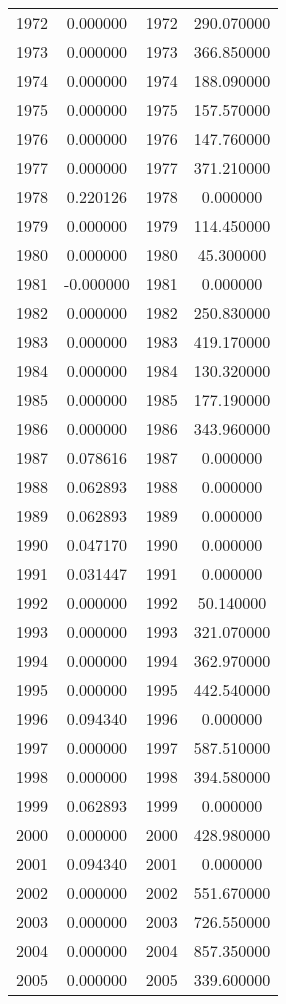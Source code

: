 \documentclass[12pt]{article}
\begin{document}
\begin{longtable}{@{}cccc@{}}
1972 & 0.000000 & 1972 & 290.070000 \\
1973 & 0.000000 & 1973 & 366.850000 \\
1974 & 0.000000 & 1974 & 188.090000 \\
1975 & 0.000000 & 1975 & 157.570000 \\
1976 & 0.000000 & 1976 & 147.760000 \\
1977 & 0.000000 & 1977 & 371.210000 \\
1978 & 0.220126 & 1978 & 0.000000 \\
1979 & 0.000000 & 1979 & 114.450000 \\
1980 & 0.000000 & 1980 & 45.300000 \\
1981 & -0.000000 & 1981 & 0.000000 \\
1982 & 0.000000 & 1982 & 250.830000 \\
1983 & 0.000000 & 1983 & 419.170000 \\
1984 & 0.000000 & 1984 & 130.320000 \\
1985 & 0.000000 & 1985 & 177.190000 \\
1986 & 0.000000 & 1986 & 343.960000 \\
1987 & 0.078616 & 1987 & 0.000000 \\
1988 & 0.062893 & 1988 & 0.000000 \\
1989 & 0.062893 & 1989 & 0.000000 \\
1990 & 0.047170 & 1990 & 0.000000 \\
1991 & 0.031447 & 1991 & 0.000000 \\
1992 & 0.000000 & 1992 & 50.140000 \\
1993 & 0.000000 & 1993 & 321.070000 \\
1994 & 0.000000 & 1994 & 362.970000 \\
1995 & 0.000000 & 1995 & 442.540000 \\
1996 & 0.094340 & 1996 & 0.000000 \\
1997 & 0.000000 & 1997 & 587.510000 \\
1998 & 0.000000 & 1998 & 394.580000 \\
1999 & 0.062893 & 1999 & 0.000000 \\
2000 & 0.000000 & 2000 & 428.980000 \\
2001 & 0.094340 & 2001 & 0.000000 \\
2002 & 0.000000 & 2002 & 551.670000 \\
2003 & 0.000000 & 2003 & 726.550000 \\
2004 & 0.000000 & 2004 & 857.350000 \\
2005 & 0.000000 & 2005 & 339.600000 \\

\end{longtable}
\end{document}
